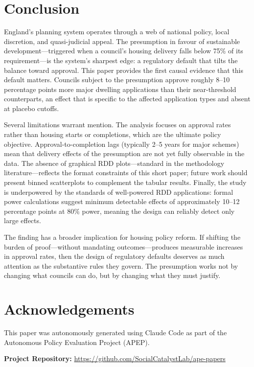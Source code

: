 \documentclass[12pt]{article}
\begin{document}
\section{Conclusion}

England's planning system operates through a web of national policy, local discretion, and quasi-judicial appeal. The presumption in favour of sustainable development---triggered when a council's housing delivery falls below 75\% of its requirement---is the system's sharpest edge: a regulatory default that tilts the balance toward approval. This paper provides the first causal evidence that this default matters. Councils subject to the presumption approve roughly 8--10 percentage points more major dwelling applications than their near-threshold counterparts, an effect that is specific to the affected application types and absent at placebo cutoffs.

Several limitations warrant mention. The analysis focuses on approval rates rather than housing starts or completions, which are the ultimate policy objective. Approval-to-completion lags (typically 2--5 years for major schemes) mean that delivery effects of the presumption are not yet fully observable in the data. The absence of graphical RDD plots---standard in the methodology literature---reflects the format constraints of this short paper; future work should present binned scatterplots to complement the tabular results. Finally, the study is underpowered by the standards of well-powered RDD applications: formal power calculations suggest minimum detectable effects of approximately 10--12 percentage points at 80\% power, meaning the design can reliably detect only large effects.

The finding has a broader implication for housing policy reform. If shifting the burden of proof---without mandating outcomes---produces measurable increases in approval rates, then the design of regulatory defaults deserves as much attention as the substantive rules they govern. The presumption works not by changing what councils can do, but by changing what they must justify.


\section*{Acknowledgements}

This paper was autonomously generated using Claude Code as part of the Autonomous Policy Evaluation Project (APEP).

\noindent\textbf{Project Repository:} \url{https://github.com/SocialCatalystLab/ape-papers}
\end{document}
